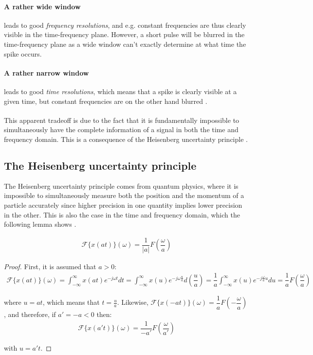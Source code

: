 \paragraph{A rather wide window} leads to good \textit{frequency resolutions}, and e.g. constant frequencies are thus clearly visible in the time-frequency plane. However, a short pulse will be blurred in the time-frequency plane as a wide window can't exactly determine at what time the spike occurs.
\paragraph{A rather narrow window} leads to good \textit{time resolutions}, which means that a spike is clearly visible at a given time, but constant frequencies are on the other hand blurred \cite{Davis}. \\\\
This apparent tradeoff is due to the fact that it is fundamentally impossible to simultaneously have the complete information of a signal in both the time and frequency domain. This is a consequence of the Heisenberg uncertainty principle \cite{Wang}.

\subsection{The Heisenberg uncertainty principle}\label{sec:heisenberg}
The Heisenberg uncertainty principle comes from quantum physics, where it is impossible to simultaneously measure both the position and the momentum of a particle accurately since higher precision in one quantity implies lower precision in the other. This is also the case in the time and frequency domain, which the following lemma shows \cite{page 123, Wang}.

\begin{lemma}
\begin{align*}
\mathcal{F}\{x(at)\}(\omega) = \dfrac{1}{|a|}F\left(\dfrac{\omega}{a}\right)
\end{align*}
\end{lemma}

\begin{proof}
First, it is assumed that $a > 0$:
\begin{align*}
\mathcal{F}\{x(at)\}(\omega) = \int_{-\infty}^\infty x(at)e^{-j\omega t} dt = \int_{-\infty}^\infty x(u) e^{-j\omega \frac{u}{a}} d\left(\dfrac{u}{a}\right) = \dfrac{1}{a} \int_{-\infty}^\infty x(u) e^{-j\frac{\omega}{a} u} du = \dfrac{1}{a} F\left(\dfrac{\omega}{a}\right)
\end{align*}

where $u = at$, which means that $t = \frac{u}{a}$. Likewise, $\mathcal{F}\{x(-at)\}(\omega) = \dfrac{1}{a} F\left(- \dfrac{\omega}{a}\right)$, and therefore, if $a' = -a < 0$ then:
\begin{align*}
\mathcal{F}\{x(a't)\}(\omega) = \dfrac{1}{-a'} F\left(\dfrac{\omega}{a'}\right)
\end{align*}

with $u = a't$.
\end{proof}


